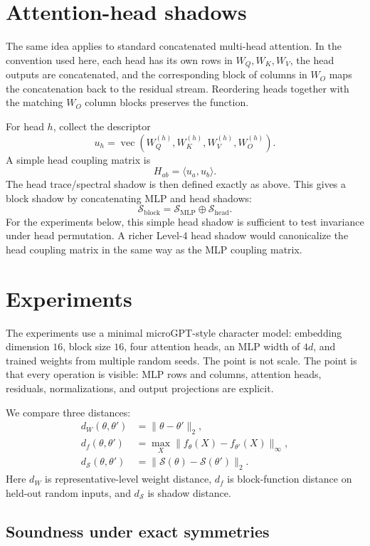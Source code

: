 \documentclass[11pt]{article}
\newcommand{\vecop}{\operatorname{vec}}
\newcommand{\MLP}{\mathrm{MLP}}
\begin{document}
\section{Attention-head shadows}

The same idea applies to standard concatenated multi-head attention. In the convention used here, each head has its own rows in $W_Q,W_K,W_V$, the head outputs are concatenated, and the corresponding block of columns in $W_O$ maps the concatenation back to the residual stream. Reordering heads together with the matching $W_O$ column blocks preserves the function.

For head $h$, collect the descriptor
\[
u_h=\vecop(W_Q^{(h)},W_K^{(h)},W_V^{(h)},W_O^{(h)}).
\]
A simple head coupling matrix is
\[
H_{ab}=\langle u_a,u_b\rangle.
\]
The head trace/spectral shadow is then defined exactly as above. This gives a block shadow by concatenating MLP and head shadows:
\[
\mathcal S_{\mathrm{block}}=\mathcal S_{\MLP}\oplus\mathcal S_{\mathrm{head}}.
\]
For the experiments below, this simple head shadow is sufficient to test invariance under head permutation. A richer Level-4 head shadow would canonicalize the head coupling matrix in the same way as the MLP coupling matrix.

\section{Experiments}

The experiments use a minimal microGPT-style character model: embedding dimension $16$, block size $16$, four attention heads, an MLP width of $4d$, and trained weights from multiple random seeds. The point is not scale. The point is that every operation is visible: MLP rows and columns, attention heads, residuals, normalizations, and output projections are explicit.

We compare three distances:
\begin{align*}
 d_W(\theta,\theta')&=\|\theta-\theta'\|_2,\\
 d_f(\theta,\theta')&=\max_X\|f_\theta(X)-f_{\theta'}(X)\|_\infty,\\
 d_{\mathcal S}(\theta,\theta')&=\|\mathcal S(\theta)-\mathcal S(\theta')\|_2.
\end{align*}
Here $d_W$ is representative-level weight distance, $d_f$ is block-function distance on held-out random inputs, and $d_{\mathcal S}$ is shadow distance.

\subsection{Soundness under exact symmetries}
\end{document}
